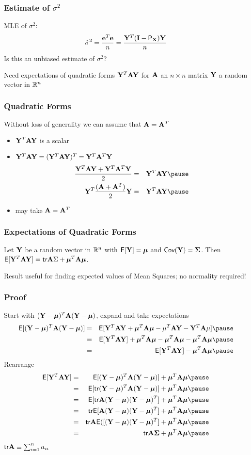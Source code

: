 \documentclass{beamer}
\begin{document}
\begin{frame}
  \frametitle{Estimate of $\sigma^2$}
MLE of $\sigma^2$:
  $${\hat{\sigma}}^2 = \frac{\mathbf{e}^T\mathbf{e}}{n} = \frac{\mathbf{Y}^T (\mathbf{I} - \textsf{P}_{\mathbf{X}}) \mathbf{Y}}{n}$$
\pause
Is this an unbiased estimate of $\sigma^2$?
\pause

\vspace{1in}
Need expectations  of quadratic forms $\mathbf{Y}^T \mathbf{A} \mathbf{Y}$ for $\mathbf{A}$ an
 $n \times n$ matrix $\mathbf{Y}$ a random vector in $\mathbb{R}^n$
\end{frame}
\begin{frame}
  \frametitle{Quadratic Forms}
  Without loss of generality we can assume that $\mathbf{A} = \mathbf{A}^T$
\pause
  \begin{itemize}
  \item $\mathbf{Y}^T \mathbf{A} \mathbf{Y}$ is a scalar \pause
\item $\mathbf{Y}^T \mathbf{A} \mathbf{Y}  = (\mathbf{Y} ^T\mathbf{A}  \mathbf{Y})^T = \mathbf{Y}^T \mathbf{A}^T \mathbf{Y}$ \pause
  \begin{eqnarray*}
 \frac{\Y^T \A \Y  + \Y^T \A^T \Y}{2} & = &
\Y^T \A \Y  \pause \\
    \Y^T\frac{(\A + \A^T)}{2}\Y  & = & \Y^T \A \Y \pause
  \end{eqnarray*}
\item may take $\mathbf{A} = \mathbf{A}^T$
  \end{itemize}
\end{frame}
\begin{frame}
  \frametitle{Expectations of Quadratic Forms}
  \begin{theorem}
   Let  $\mathbf{Y}$ be a random vector in $\mathbb{R}^n$ with $\textsf{E}[\mathbf{Y}] = \boldsymbol{\mu}$ and
   $\textsf{Cov}(\mathbf{Y}) = \boldsymbol{\Sigma}$.  \pause Then $\textsf{E}[\mathbf{Y}^T \mathbf{A} \mathbf{Y}] = \textsf{tr} \mathbf{A} \Sigma + \boldsymbol{\mu}^T
   \mathbf{A} \boldsymbol{\mu}$.
  \end{theorem} \pause
Result useful for finding expected values of Mean Squares; no
normality required!
\end{frame}
\begin{frame}
  \frametitle{Proof}
Start with $(\mathbf{Y} - \boldsymbol{\mu})^T\mathbf{A} (\mathbf{Y} - \boldsymbol{\mu})$,  expand and take
expectations \pause
  \begin{eqnarray*}
\E [(\Y - \mub)^T\A (\Y - \mub)] & = & \E[\Y^T\A \Y + \mub^T\A \mub -
    \mu^T\A \Y - \Y^T \A \mu] \pause \\
 & = & \E[\Y^T\A \Y] + \mub^T\A \mub -
\mub^T\A \mub - \mub^T\A \mub \pause \\
 & = & \E[\Y^T\A \Y] - \mub^T\A \mub \pause 
  \end{eqnarray*}
Rearrange \pause
 \begin{eqnarray*}
 \E[\Y^T\A \Y ] & = &  \E[ (\Y - \mub)^T\A (\Y - \mub)] + \mub^T\A
 \mub \pause \\
 & = & \E[ \tr (\Y - \mub)^T\A (\Y - \mub)] + \mub^T\A \mub  \pause\\
 & = & \E[ \tr \A (\Y - \mub) (\Y - \mub)^T] + \mub^T\A
 \mub \pause \\
 & = &\tr  \E[ \A (\Y - \mub) (\Y - \mub)^T] + \mub^T\A \mub \pause \\
 & = &\tr \A \E([ (\Y - \mub) (\Y - \mub)^T] + \mub^T\A \mub \pause \\
 & = &\tr \A \Sigmab + \mub^T\A \mub  \pause
\end{eqnarray*}
\alert<12>{{\small{$\textsf{tr} \mathbf{A} \equiv \sum_{i=1}^n a_{ii}$}}}
\end{frame}
\end{document}
